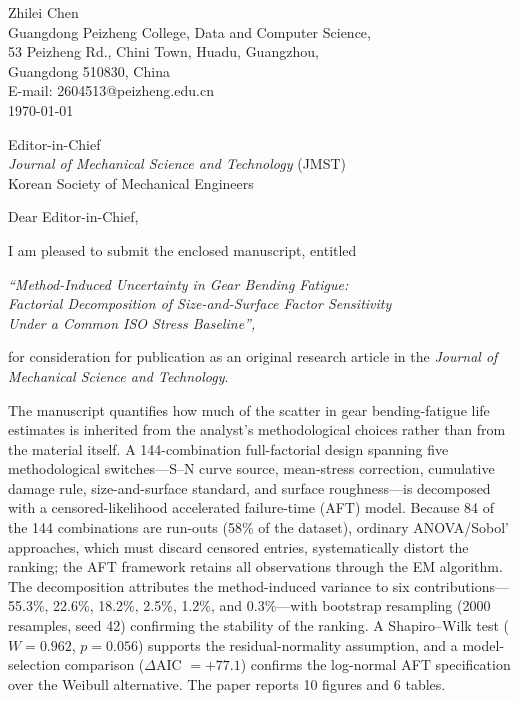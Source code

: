 \documentclass[12pt,a4paper]{article}
\begin{document}
\begin{flushright}
Zhilei Chen\\
Guangdong Peizheng College, Data and Computer Science,\\
53 Peizheng Rd., Chini Town, Huadu, Guangzhou,\\
Guangdong 510830, China\\
E-mail: 2604513@peizheng.edu.cn\\[4pt]
\today
\end{flushright}

\vspace{2mm}

\begin{flushleft}
Editor-in-Chief\\
\textit{Journal of Mechanical Science and Technology} (JMST)\\
Korean Society of Mechanical Engineers
\end{flushleft}

\vspace{4mm}

Dear Editor-in-Chief,

I am pleased to submit the enclosed manuscript, entitled

\begin{center}
\itshape ``Method-Induced Uncertainty in Gear Bending Fatigue:\\
Factorial Decomposition of Size-and-Surface Factor Sensitivity\\
Under a Common ISO Stress Baseline'',
\end{center}

for consideration for publication as an original research article in
the \textit{Journal of Mechanical Science and Technology}.

The manuscript quantifies how much of the scatter in gear
bending-fatigue life estimates is inherited from the analyst's
methodological choices rather than from the material itself. A
144-combination full-factorial design spanning five methodological
switches---S--N curve source, mean-stress correction, cumulative
damage rule, size-and-surface standard, and surface roughness---is
decomposed with a censored-likelihood accelerated failure-time (AFT)
model. Because 84 of the 144 combinations are run-outs (58\% of the
dataset), ordinary ANOVA/Sobol' approaches, which must discard
censored entries, systematically distort the ranking; the AFT
framework retains all observations through the EM algorithm. The
decomposition attributes the method-induced variance to six
contributions---55.3\%, 22.6\%, 18.2\%, 2.5\%, 1.2\%, and 0.3\%---with
bootstrap resampling (2000 resamples, seed 42) confirming the
stability of the ranking. A Shapiro--Wilk test ($W=0.962$, $p=0.056$)
supports the residual-normality assumption, and a model-selection
comparison ($\Delta$AIC $= +77.1$) confirms the log-normal AFT
specification over the Weibull alternative. The paper reports 10
figures and 6 tables.
\end{document}
